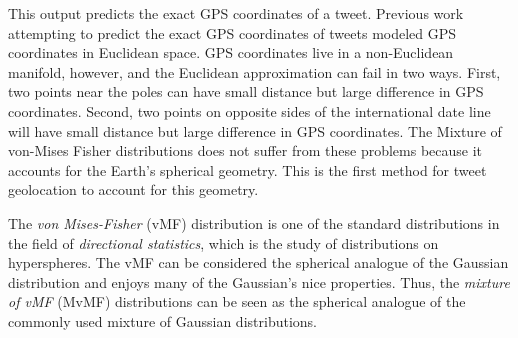 \documentclass[sigconf,anonymous,review]{acmart}
\newcommand{\defn}[1]{\textit{#1}}
\begin{document}
\begin{description}
        This output predicts the exact GPS coordinates of a tweet.
        Previous work attempting to predict the exact GPS coordinates of tweets \citep{duong2016near} modeled GPS coordinates in Euclidean space.
        GPS coordinates live in a non-Euclidean manifold, however, and the Euclidean approximation can fail in two ways.
        First, two points near the poles can have small distance but large difference in GPS coordinates.
        Second, two points on opposite sides of the international date line will have small distance but large difference in GPS coordinates.
        The Mixture of von-Mises Fisher distributions does not suffer from these problems because it accounts for the Earth's spherical geometry.
        This is the first method for tweet geolocation to account for this geometry.

        The \defn{von Mises-Fisher} (vMF) distribution is one of the standard distributions in the field of \defn{directional statistics},
        which is the study of distributions on hyperspheres.
        The vMF can be considered the spherical analogue of the Gaussian distribution \citep[e.g.][]{mardia2009directional} and enjoys many of the Gaussian's nice properties.
        Thus, the \defn{mixture of vMF} (MvMF) distributions can be seen as the spherical analogue of the commonly used mixture of Gaussian distributions.


\end{description}
\end{document}
